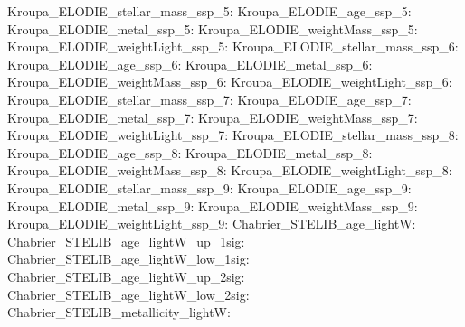 Kroupa\_ELODIE\_stellar\_mass\_ssp\_5:  \newline 
Kroupa\_ELODIE\_age\_ssp\_5:  \newline 
Kroupa\_ELODIE\_metal\_ssp\_5:  \newline 
Kroupa\_ELODIE\_weightMass\_ssp\_5:  \newline 
Kroupa\_ELODIE\_weightLight\_ssp\_5:  \newline 
Kroupa\_ELODIE\_stellar\_mass\_ssp\_6:  \newline 
Kroupa\_ELODIE\_age\_ssp\_6:  \newline 
Kroupa\_ELODIE\_metal\_ssp\_6:  \newline 
Kroupa\_ELODIE\_weightMass\_ssp\_6:  \newline 
Kroupa\_ELODIE\_weightLight\_ssp\_6:  \newline 
Kroupa\_ELODIE\_stellar\_mass\_ssp\_7:  \newline 
Kroupa\_ELODIE\_age\_ssp\_7:  \newline 
Kroupa\_ELODIE\_metal\_ssp\_7:  \newline 
Kroupa\_ELODIE\_weightMass\_ssp\_7:  \newline 
Kroupa\_ELODIE\_weightLight\_ssp\_7:  \newline 
Kroupa\_ELODIE\_stellar\_mass\_ssp\_8:  \newline 
Kroupa\_ELODIE\_age\_ssp\_8:  \newline 
Kroupa\_ELODIE\_metal\_ssp\_8:  \newline 
Kroupa\_ELODIE\_weightMass\_ssp\_8:  \newline 
Kroupa\_ELODIE\_weightLight\_ssp\_8:  \newline 
Kroupa\_ELODIE\_stellar\_mass\_ssp\_9:  \newline 
Kroupa\_ELODIE\_age\_ssp\_9:  \newline 
Kroupa\_ELODIE\_metal\_ssp\_9:  \newline 
Kroupa\_ELODIE\_weightMass\_ssp\_9:  \newline 
Kroupa\_ELODIE\_weightLight\_ssp\_9:  \newline 
Chabrier\_STELIB\_age\_lightW:  \newline 
Chabrier\_STELIB\_age\_lightW\_up\_1sig:  \newline 
Chabrier\_STELIB\_age\_lightW\_low\_1sig:  \newline 
Chabrier\_STELIB\_age\_lightW\_up\_2sig:  \newline 
Chabrier\_STELIB\_age\_lightW\_low\_2sig:  \newline 
Chabrier\_STELIB\_metallicity\_lightW:  \newline 
